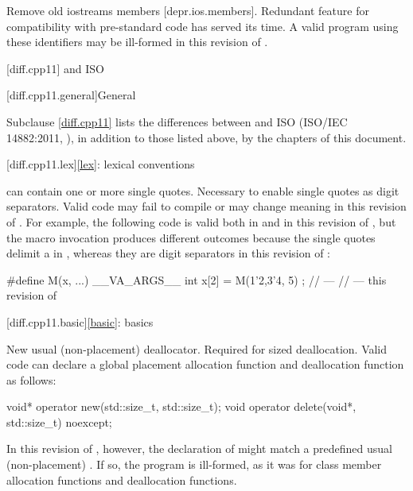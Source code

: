 \nodiffref
\change
Remove old iostreams members [depr.ios.members].
\rationale
Redundant feature for compatibility with pre-standard code
has served its time.
\effect
A valid \CppXIV{} program using these identifiers
may be ill-formed in this revision of \Cpp{}.

[diff.cpp11]{\Cpp{} and ISO \CppXI{}}

[diff.cpp11.general]{General}

\pnum
{}%
Subclause \ref{diff.cpp11} lists the differences between \Cpp{} and
ISO \CppXI{} (ISO/IEC 14882:2011, ),
in addition to those listed above,
by the chapters of this document.

[diff.cpp11.lex]{\ref{lex}: lexical conventions}

\change
{} can contain one or more single quotes.
\rationale
Necessary to enable single quotes as digit separators.
\effect
Valid \CppXI{} code may fail to compile or may change meaning in this
revision of \Cpp{}. For example, the following code is valid both in \CppXI{} and in
this revision of \Cpp{}, but the macro invocation produces different outcomes
because the single quotes delimit a  in \CppXI{}, whereas they are digit
separators in this revision of \Cpp{}:

\begin{codeblock}
#define M(x, ...) __VA_ARGS__
int x[2] = { M(1'2,3'4, 5) };
//  --- \CppXI{}
//  --- this revision of \Cpp{}
\end{codeblock}

[diff.cpp11.basic]{\ref{basic}: basics}

\change
New usual (non-placement) deallocator.
\rationale
Required for sized deallocation.
\effect
Valid \CppXI{} code can declare a global placement allocation function and
deallocation function as follows:
\begin{codeblock}
void* operator new(std::size_t, std::size_t);
void operator delete(void*, std::size_t) noexcept;
\end{codeblock}

In this revision of \Cpp{}, however, the declaration of 
might match a predefined usual (non-placement)
. If so, the
program is ill-formed, as it was for class member allocation functions and
deallocation functions.

